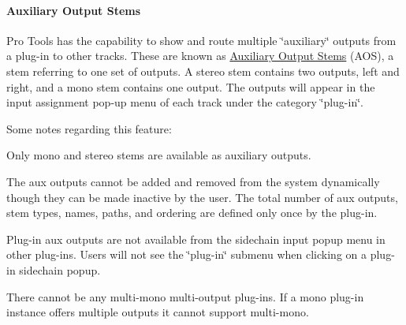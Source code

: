 \hypertarget{a00360_subsubsection__auxiliary_output_stems_}{}\paragraph{Auxiliary Output Stems}\label{a00360_subsubsection__auxiliary_output_stems_}
Pro Tools has the capability to show and route multiple \char`\"{}auxiliary\char`\"{} outputs from a plug-\/in to other tracks. These are known as \hyperlink{a00339}{Auxiliary Output Stems} (A\+O\+S), a stem referring to one set of outputs. A stereo stem contains two outputs, left and right, and a mono stem contains one output. The outputs will appear in the input assignment pop-\/up menu of each track under the category \char`\"{}plug-\/in\char`\"{}.

Some notes regarding this feature\+: 
\begin{DoxyItemize}
\item Only mono and stereo stems are available as auxiliary outputs.  
\item The aux outputs cannot be added and removed from the system dynamically though they can be made inactive by the user. The total number of aux outputs, stem types, names, paths, and ordering are defined only once by the plug-\/in.  
\item Plug-\/in aux outputs are not available from the sidechain input popup menu in other plug-\/ins. Users will not see the \char`\"{}plug-\/in\char`\"{} submenu when clicking on a plug-\/in sidechain popup.  
\item There cannot be any multi-\/mono multi-\/output plug-\/ins. If a mono plug-\/in instance offers multiple outputs it cannot support multi-\/mono.  
\end{DoxyItemize}

